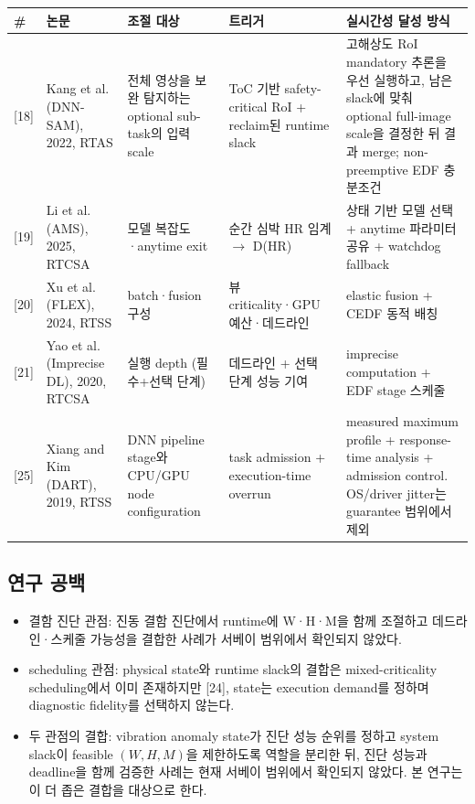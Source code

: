 \documentclass[10pt]{article}
\begin{document}
\begin{center}\scriptsize
\begin{tabular}{@{}C{0.6cm}L{2.2cm}L{2.8cm}L{2.8cm}L{4.5cm}@{}}
\toprule
\# & 논문 & 조절 대상 & 트리거 & 실시간성 달성 방식 \\ \midrule
{[18]} & Kang et al. (DNN-SAM), 2022, RTAS & 전체 영상을 보완 탐지하는 optional sub-task의 입력 scale & ToC 기반 safety-critical RoI + reclaim된 runtime slack & 고해상도 RoI mandatory 추론을 우선 실행하고, 남은 slack에 맞춰 optional full-image scale을 결정한 뒤 결과 merge; non-preemptive EDF 충분조건 \\
{[19]} & Li et al. (AMS), 2025, RTCSA & 모델 복잡도·anytime exit & 순간 심박 HR 임계 $\rightarrow$ D(HR) & 상태 기반 모델 선택 + anytime 파라미터 공유 + watchdog fallback \\
{[20]} & Xu et al. (FLEX), 2024, RTSS & batch·fusion 구성 & 뷰 criticality·GPU 예산·데드라인 & elastic fusion + CEDF 동적 배칭 \\
{[21]} & Yao et al. (Imprecise DL), 2020, RTCSA & 실행 depth (필수+선택 단계) & 데드라인 + 선택 단계 성능 기여 & imprecise computation + EDF stage 스케줄 \\
{[25]} & Xiang and Kim (DART), 2019, RTSS & DNN pipeline stage와 CPU/GPU node configuration & task admission + execution-time overrun & measured maximum profile + response-time analysis + admission control. OS/driver jitter는 guarantee 범위에서 제외 \\
\bottomrule
\end{tabular}
\end{center}

\subsection{연구 공백}
\begin{itemize}
\item 결함 진단 관점: 진동 결함 진단에서 runtime에 W·H·M을 함께 조절하고 데드라인·스케줄 가능성을 결합한 사례가 서베이 범위에서 확인되지 않았다.
\item scheduling 관점: physical state와 runtime slack의 결합은 mixed-criticality scheduling에서 이미 존재하지만 [24], state는 execution demand를 정하며 diagnostic fidelity를 선택하지 않는다.
\item 두 관점의 결합: vibration anomaly state가 진단 성능 순위를 정하고 system slack이 feasible $(W,H,M)$을 제한하도록 역할을 분리한 뒤, 진단 성능과 deadline을 함께 검증한 사례는 현재 서베이 범위에서 확인되지 않았다. 본 연구는 이 더 좁은 결합을 대상으로 한다.
\end{itemize}
\end{document}
